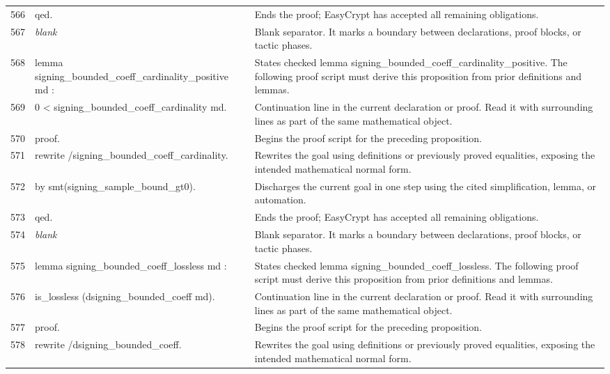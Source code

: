 \documentclass[10pt]{article}
\begin{document}
\begin{longtable}{r L{0.53\textwidth} L{0.37\textwidth}}
566 & {\ttfamily\scriptsize qed.} & Ends the proof; EasyCrypt has accepted all remaining obligations. \\
567 & {\ttfamily\scriptsize \emph{blank}} & Blank separator.  It marks a boundary between declarations, proof blocks, or tactic phases. \\
568 & {\ttfamily\scriptsize lemma signing\_bounded\_coeff\_cardinality\_positive md :} & States checked lemma signing\_bounded\_coeff\_cardinality\_positive.  The following proof script must derive this proposition from prior definitions and lemmas. \\
569 & {\ttfamily\scriptsize   0 < signing\_bounded\_coeff\_cardinality md.} & Continuation line in the current declaration or proof.  Read it with surrounding lines as part of the same mathematical object. \\
570 & {\ttfamily\scriptsize proof.} & Begins the proof script for the preceding proposition. \\
571 & {\ttfamily\scriptsize rewrite /signing\_bounded\_coeff\_cardinality.} & Rewrites the goal using definitions or previously proved equalities, exposing the intended mathematical normal form. \\
572 & {\ttfamily\scriptsize by smt(signing\_sample\_bound\_gt0).} & Discharges the current goal in one step using the cited simplification, lemma, or automation. \\
573 & {\ttfamily\scriptsize qed.} & Ends the proof; EasyCrypt has accepted all remaining obligations. \\
574 & {\ttfamily\scriptsize \emph{blank}} & Blank separator.  It marks a boundary between declarations, proof blocks, or tactic phases. \\
575 & {\ttfamily\scriptsize lemma signing\_bounded\_coeff\_lossless md :} & States checked lemma signing\_bounded\_coeff\_lossless.  The following proof script must derive this proposition from prior definitions and lemmas. \\
576 & {\ttfamily\scriptsize   is\_lossless (dsigning\_bounded\_coeff md).} & Continuation line in the current declaration or proof.  Read it with surrounding lines as part of the same mathematical object. \\
577 & {\ttfamily\scriptsize proof.} & Begins the proof script for the preceding proposition. \\
578 & {\ttfamily\scriptsize rewrite /dsigning\_bounded\_coeff.} & Rewrites the goal using definitions or previously proved equalities, exposing the intended mathematical normal form. \\

\end{longtable}
\end{document}
